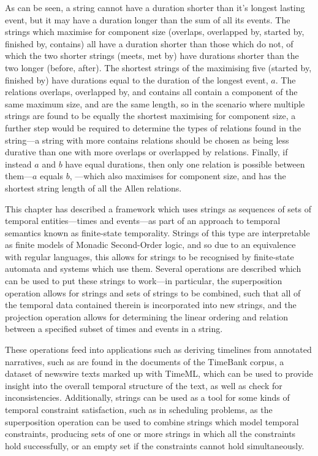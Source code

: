 \documentclass[a4paper,12pt,leqno]{article}
\newcommand{\vph}[1]{\vphantom{#1}}
\newcommand{\ebox}[1]{\fbox{$\vph{'(),}#1$}}
\newcommand{\EventString}[1]{%
	\renewcommand*{\do}[1]{\ebox{##1}}%
	\PipeParser{#1}%
}
\begin{document}
As can be seen, a string cannot have a duration shorter than it's longest lasting event, but it may have a duration longer than the sum of all its events. The strings which maximise for component size (overlaps, overlapped by, started by, finished by, contains) all have a duration shorter than those which do not, of which the two shorter strings (meets, met by) have durations shorter than the two longer (before, after). The shortest strings of the maximising five (started by, finished by) have durations equal to the duration of the longest event, $a$. The relations overlaps, overlapped by, and contains all contain a component of the same maximum size, and are the same length, so in the scenario where multiple strings are found to be equally the shortest maximising for component size, a further step would be required to determine the types of relations found in the string---a string with more contains relations should be chosen as being less durative than one with more overlaps or overlapped by relations. Finally, if instead $a$ and $b$ have equal durations, then only one relation is possible between them---$a$ equals $b$, \EventString{{}|a,b|{}}---which also maximises for component size, and has the shortest string length of all the Allen relations.

This chapter has described a framework which uses strings as sequences of sets of temporal entities---times and events---as part of an approach to temporal semantics known as finite-state temporality. Strings of this type are interpretable as finite models of Monadic Second-Order logic, and so due to an equivalence with regular languages, this allows for strings to be recognised by finite-state automata and systems which use them. Several operations are described which can be used to put these strings to work---in particular, the superposition operation allows for strings and sets of strings to be combined, such that all of the temporal data contained therein is incorporated into new strings, and the projection operation allows for determining the linear ordering and relation between a specified subset of times and events in a string.

These operations feed into applications such as deriving timelines from annotated narratives, such as are found in the documents of the TimeBank corpus, a dataset of newswire texts marked up with TimeML, which can be used to provide insight into the overall temporal structure of the text, as well as check for inconsistencies. Additionally, strings can be used as a tool for some kinds of temporal constraint satisfaction, such as in scheduling problems, as the superposition operation can be used to combine strings which model temporal constraints, producing sets of one or more strings in which all the constraints hold successfully, or an empty set if the constraints cannot hold simultaneously.
\end{document}
